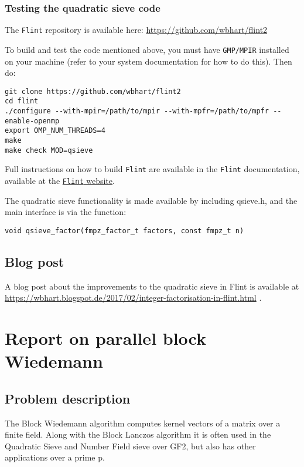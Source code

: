 \subsubsection{Testing the quadratic sieve
code}\label{testing-the-quadratic-sieve-code}

The \texttt{Flint} repository is available here:
\url{https://github.com/wbhart/flint2}

To build and test the code mentioned above, you must have
\texttt{GMP/MPIR} installed on your machine (refer to your system
documentation for how to do this). Then do:

\begin{verbatim}
git clone https://github.com/wbhart/flint2
cd flint
./configure --with-mpir=/path/to/mpir --with-mpfr=/path/to/mpfr --enable-openmp
export OMP_NUM_THREADS=4
make
make check MOD=qsieve
\end{verbatim}

Full instructions on how to build \texttt{Flint} are available in the
\texttt{Flint} documentation, available at the
\href{http://flintlib.org}{\texttt{Flint} website}.

The quadratic sieve functionality is made available by including
qsieve.h, and the main interface is via the function:

\begin{verbatim}
void qsieve_factor(fmpz_factor_t factors, const fmpz_t n)
\end{verbatim}

\subsection{Blog post}\label{blog-post}

A blog post about the improvements to the quadratic sieve in Flint is
available at
\url{https://wbhart.blogspot.de/2017/02/integer-factorisation-in-flint.html}
.

\section{Report on parallel block
Wiedemann}\label{report-on-parallel-block-wiedemann}

\subsection{Problem description}\label{problem-description-1}

The Block Wiedemann algorithm computes kernel vectors of a matrix over a
finite field. Along with the Block Lanczos algorithm it is often used in
the Quadratic Sieve and Number Field sieve over GF2, but also has other
applications over a prime p.

